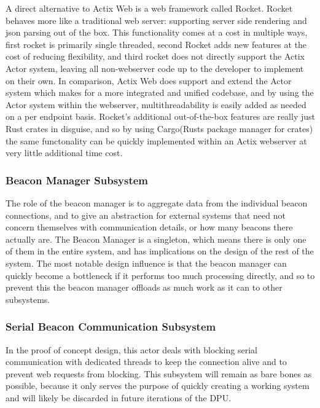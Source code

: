 \bigskip
A direct alternative to Actix Web is a web framework called Rocket.
Rocket behaves more like a traditional web server: supporting server side rendering and json parsing out of the box.
This functionality comes at a cost in multiple ways, first rocket is primarily single threaded, second Rocket adds new features at the cost of reducing flexibility, and third rocket does not directly support the Actix Actor system, leaving all non-webserver code up to the developer to implement on their own.
In comparison, Actix Web does support and extend the Actor system which makes for a more integrated and unified codebase, and by using the Actor system within the webserver, multithreadability is easily added as needed on a per endpoint basis.
Rocket's additional out-of-the-box features are really just Rust crates in disguise, and so by using Cargo(Rusts package manager for crates) the same functonality can be quickly implemented within an Actix webserver at very little additional time cost.

\medskip
\subsubsection{Beacon Manager Subsystem}
The role of the beacon manager is to aggregate data from the individual beacon connections, and to give an abstraction for external systems that need not concern themselves with communication details, or how many beacons there actually are.
The Beacon Manager is a singleton, which means there is only one of them in the entire system, and has implications on the design of the rest of the system.
The most notable design influence is that the beacon manager can quickly become a bottleneck if it performs too much processing directly, and so to prevent this the beacon manager offloads as much work as it can to other subsystems.

\medskip
\subsubsection{Serial Beacon Communication Subsystem}
In the proof of concept design, this actor deals with blocking serial communication with dedicated threads to keep the connection alive and to prevent web requests from blocking.
This subsystem will remain as bare bones as possible, because it only serves the purpose of quickly creating a working system and will likely be discarded in future iterations of the DPU.

\pagebreak
